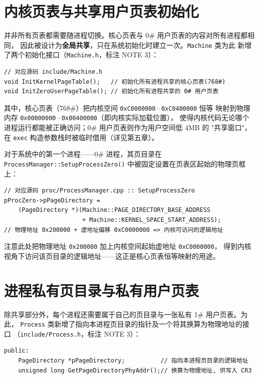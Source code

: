 \section{内核页表与共享用户页表初始化}
并非所有页表都需要随进程切换。核心页表与 0\# 用户页表的内容对所有进程都相同，
因此被设计为\textbf{全局共享}，只在系统初始化时建立一次。\texttt{Machine} 类为此
新增了两个初始化接口（\texttt{Machine.h}，标注 NOTE 3）：

\begin{lstlisting}[caption={核心页表与共享用户页表的初始化接口},label={lst:machine-init}]
// 对应源码 include/Machine.h
void InitKernelPageTable();   // 初始化所有进程共享的核心页表(768#)
void InitZeroUserPageTable(); // 初始化所有进程共享的 0# 用户页表
\end{lstlisting}

其中，核心页表（768\#）把内核空间 \texttt{0xC0000000}\,–\,\texttt{0xC0400000} 恒等
映射到物理内存 \texttt{0x00000000}\,–\,\texttt{0x00400000}（即内核实际加载位置），
使得内核代码无论哪个进程运行都能被正确访问；0\# 用户页表则作为用户空间低 4MB 的
"共享窗口"，在 \texttt{exec} 构造参数栈时被临时借用（详见第五章）。

对于系统中的第一个进程——0\# 进程，其页目录在
\texttt{ProcessManager::SetupProcessZero()} 中被固定设置在页表区起始的物理页框上：

\begin{lstlisting}[caption={0\# 进程页目录的设置},label={lst:setup-zero}]
// 对应源码 proc/ProcessManager.cpp :: SetupProcessZero
pProcZero->pPageDirectory =
    (PageDirectory *)(Machine::PAGE_DIRECTORY_BASE_ADDRESS
                      + Machine::KERNEL_SPACE_START_ADDRESS);
// 物理地址 0x200000 + 虚地址偏移 0xC0000000 => 内核可访问的逻辑地址
\end{lstlisting}

注意此处把物理地址 \texttt{0x200000} 加上内核空间起始虚地址 \texttt{0xC0000000}，
得到内核视角下访问该页目录的逻辑地址——这正是核心页表恒等映射的用途。

\section{进程私有页目录与私有用户页表}
除共享部分外，每个进程还需要属于自己的页目录与一张私有 1\# 用户页表。为此，
\texttt{Process} 类新增了指向本进程页目录的指针及一个将其换算为物理地址的接口
（\texttt{include/Process.h}，标注 NOTE 3）：

\begin{lstlisting}[caption={Process 类新增的页目录成员},label={lst:proc-pdir}]
public:
    PageDirectory *pPageDirectory;          // 指向本进程页目录的逻辑地址
    unsigned long GetPageDirectoryPhyAddr();// 换算为物理地址, 供写入 CR3
\end{lstlisting}

